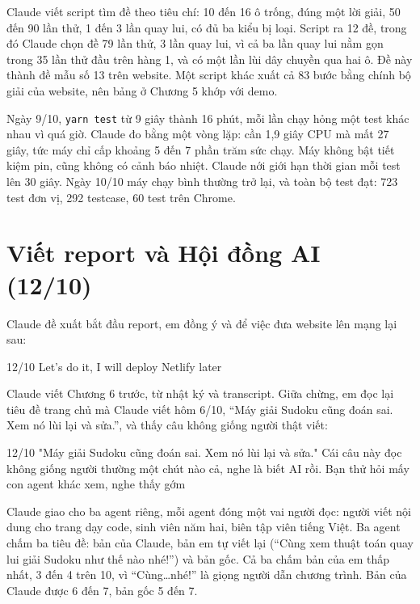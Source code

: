 Claude viết script tìm đề theo tiêu chí: 10 đến 16 ô trống, đúng một lời giải, 50 đến 90 lần thử, 1 đến 3 lần quay lui, có đủ ba kiểu bị loại. Script ra 12 đề, trong đó Claude chọn đề 79 lần thử, 3 lần quay lui, vì cả ba lần quay lui nằm gọn trong 35 lần thử đầu trên hàng 1, và có một lần lùi dây chuyền qua hai ô. Đề này thành đề mẫu số 13 trên website. Một script khác xuất cả 83 bước bằng chính bộ giải của website, nên bảng ở Chương 5 khớp với demo.

Ngày 9/10, \texttt{yarn test} từ 9 giây thành 16 phút, mỗi lần chạy hỏng một test khác nhau vì quá giờ. Claude đo bằng một vòng lặp: cần 1,9 giây CPU mà mất 27 giây, tức máy chỉ cấp khoảng 5 đến 7 phần trăm sức chạy. Máy không bật tiết kiệm pin, cũng không có cảnh báo nhiệt. Claude nới giới hạn thời gian mỗi test lên 30 giây. Ngày 10/10 máy chạy bình thường trở lại, và toàn bộ test đạt: 723 test đơn vị, 292 testcase, 60 test trên Chrome.

\section{Viết report và Hội đồng AI (12/10)}
\label{sec:report-writing}

Claude đề xuất bắt đầu report, em đồng ý và để việc đưa website lên mạng lại sau:

\begin{promptbox}{12/10}
Let's do it, I will deploy Netlify later
\end{promptbox}

Claude viết Chương 6 trước, từ nhật ký và transcript. Giữa chừng, em đọc lại tiêu đề trang chủ mà Claude viết hôm 6/10, ``Máy giải Sudoku cũng đoán sai. Xem nó lùi lại và sửa.'', và thấy câu không giống người thật viết:

\begin{promptbox}{12/10}
"Máy giải Sudoku cũng đoán sai. Xem nó lùi lại và sửa." Cái câu này đọc không giống người thường một chút nào cả, nghe là biết AI rồi. Bạn thử hỏi mấy con agent khác xem, nghe thấy gớm
\end{promptbox}

Claude giao cho ba agent riêng, mỗi agent đóng một vai người đọc: người viết nội dung cho trang dạy code, sinh viên năm hai, biên tập viên tiếng Việt. Ba agent chấm ba tiêu đề: bản của Claude, bản em tự viết lại (``Cùng xem thuật toán quay lui giải Sudoku như thế nào nhé!'') và bản gốc. Cả ba chấm bản của em thấp nhất, 3 đến 4 trên 10, vì ``Cùng\ldots nhé!'' là giọng người dẫn chương trình. Bản của Claude được 6 đến 7, bản gốc 5 đến 7.

